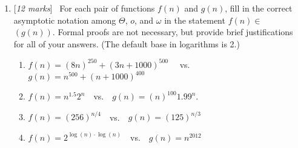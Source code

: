 \documentclass[11pt]{article}
\newcommand{\Q}[1]{\medskip\item {[{\em #1 marks\/}]}\ }
\newif\ifsol
\newcommand{\solution}[1]{{\ifsol \color{red} {#1} \fi}}
\begin{document}
\begin{enumerate}
\begin{enumerate}
\solution{
    We want to prove that there exists $c_1 > 0, c_2 > 0$ such that 
    $$c_1 \lvert (f(n) + g(n)) \rvert \leq \lvert \max\{f(n), g(n)\} \rvert 
    \leq \lvert c_2 (f(n) + g(n)) \rvert$$ for all $n \leq n_0$
    Let $c_1 = \frac 1 2, c_2 = 1$
    \begin{align*}
        2\max\{f(n), g(n)\} &\leq f(n) + g(n)\\
        \text{Hence, }\max\{f(n), g(n)\} &\leq \frac 1 2 (f(n) + g(n)) \text{ for all n}
    \end{align*}
    If $\max\{f(n), g(n)\} = f(n)$, \\$\max\{f(n), g(n)\} = f(n) < f(n) + g(n)$ since $g(n) > 0$ for all $n$\\
    If $\max\{f(n), g(n)\} = g(n)$, \\$\max\{f(n), g(n)\} = g(n) < f(n) + g(n)$ since $f(n) > 0$ for all $n$\\
    Therefore $\max\{f(n), g(n)\}=\Theta(f(n) + g(n))$
}

\end{enumerate}

\Q{12} 
For each pair of functions $f(n)$ and $g(n)$, 
fill in the correct asymptotic notation among $\Theta$,
$o$, and $\omega$ in the statement $f(n)\in$ \verb*| | $(g(n))$.
Formal proofs are not necessary, but provide brief justifications
for all of your answers. (The default base in logarithms is 2.)
\begin{enumerate}
\item $f(n) = (8n)^{250} + (3n + 1000)^{500}$ \ \ vs.\ \ $g(n)=n^{500} + (n+1000)^{400}$

\solution{
    $f(n)\in \Theta(g(n))$\\
    $\lim_{n \to \infty} \frac {f(n)} {g(n)} = 3^{500}$
}

\item $f(n)= n^{1.5}2^n $\ \ vs.\ \ $g(n)= (n)^{100}1.99^n$.

\solution{
    $f(n)\in \omega (g(n))$\\
    $$\lim_{n \to \infty} \frac {n^{1.5}2^n} {n^{100}1.99^n} = \frac {(\frac 2 {1.99})^n} {n^{98.5}} 
    \overset {L'H} {=} \infty$$
}


\item $f(n)=(256)^{n/4}$\ \ vs.\ \ $g(n)=(125)^{n/3}$

\solution{
    $f(n)\in o (g(n))$\\
    $$\lim_{n \to \infty} \frac {256^{n/4}} {125^{n/3}} = (\frac 4 5)^n = 0$$
}

\item $f(n) = 2^{\log(n) \cdot \log(n)} $\ \ vs.\ \ $g(n)=n^{2012}$


\end{enumerate}
\end{enumerate}
\end{document}
